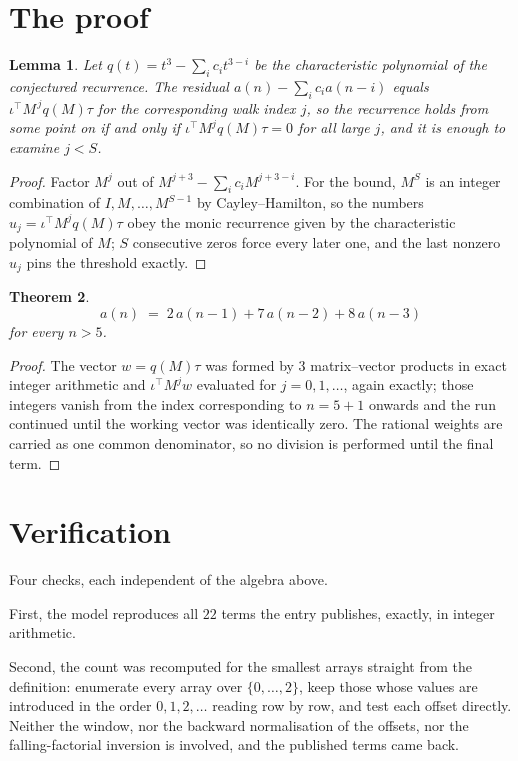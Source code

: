 \documentclass[11pt,a4paper]{article}
\theoremstyle{plain}
\newtheorem{theorem}{Theorem}
\newtheorem{lemma}[theorem]{Lemma}
\theoremstyle{definition}
\begin{document}
\section{The proof}

\begin{lemma}\label{lem:crit}
Let $q(t)=t^{3}-\sum_i c_it^{3-i}$ be the characteristic polynomial of the
conjectured recurrence. The residual $a(n)-\sum_ic_ia(n-i)$ equals
$\iota^{\!\top}M^{\,j}q(M)\tau$ for the corresponding walk index $j$, so the recurrence
holds from some point on if and only if $\iota^{\!\top}M^{j}q(M)\tau=0$ for all large $j$,
and it is enough to examine $j<S$.
\end{lemma}

\begin{proof}
Factor $M^{j}$ out of $M^{j+3}-\sum_ic_iM^{j+3-i}$. For the bound, $M^{S}$
is an integer combination of $I,M,\dots,M^{S-1}$ by Cayley--Hamilton, so the numbers
$u_j=\iota^{\!\top}M^{j}q(M)\tau$ obey the monic recurrence given by the characteristic
polynomial of $M$; $S$ consecutive zeros force every later one, and the last nonzero $u_j$
pins the threshold exactly.
\end{proof}

\begin{theorem}
\[
a(n)\;=\;2\,a(n-1) + 7\,a(n-2) + 8\,a(n-3)
\]
for every $n>5$.
\end{theorem}

\begin{proof}
The vector $w=q(M)\tau$ was formed by $3$ matrix--vector products in exact integer
arithmetic and $\iota^{\!\top}M^{j}w$ evaluated for $j=0,1,\dots$, again exactly; those
integers vanish from the index corresponding to $n=5+1$ onwards and the run continued
until the working vector was identically zero. The rational weights are carried as one common
denominator, so no division is performed until the final term.
\end{proof}

\section{Verification}

Four checks, each independent of the algebra above.

First, the model reproduces all $22$ terms the entry publishes, exactly, in integer
arithmetic.

Second, the count was recomputed for the smallest arrays straight from the definition:
enumerate every array over $\{0,\dots,2\}$, keep those whose values are introduced in the
order $0,1,2,\dots$ reading row by row, and test each offset directly. Neither the window, nor
the backward normalisation of the offsets, nor the falling-factorial inversion is involved, and
the published terms came back.
\end{document}
